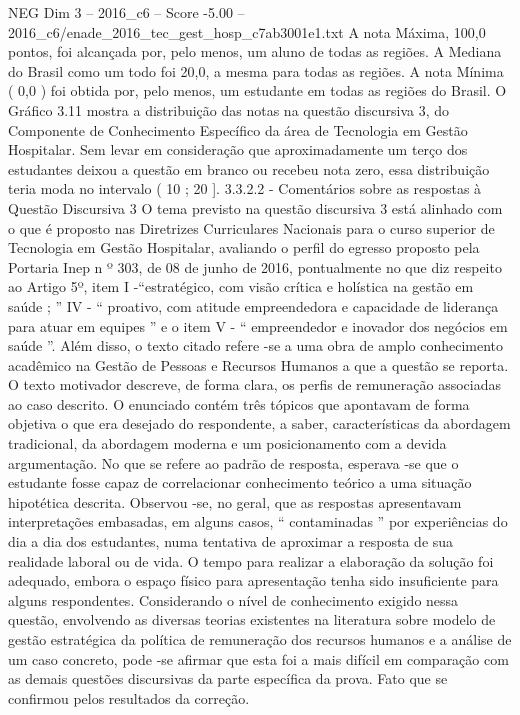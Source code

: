 \begin{textsample}{NEG Dim 3 – 2016\_c6 – Score -5.00 – 2016\_c6/enade\_2016\_tec\_gest\_hosp\_c7ab3001e1.txt}
A nota Máxima, 100,0 pontos, foi alcançada por, pelo menos, um aluno de todas as regiões.
A Mediana do Brasil como um todo foi 20,0, a mesma para todas as regiões.
A nota Mínima ( 0,0 ) foi obtida por, pelo menos, um estudante em todas as regiões do Brasil.
O Gráfico 3.11 mostra a distribuição das notas na questão discursiva 3, do Componente de Conhecimento Específico da área de Tecnologia em Gestão Hospitalar.
Sem levar em consideração que aproximadamente um terço dos estudantes deixou a questão em branco ou recebeu nota zero, essa distribuição teria moda no intervalo ( 10 ; 20 ]. 3.3.2.2 - Comentários sobre as respostas à Questão Discursiva 3 O tema previsto na questão discursiva 3 está alinhado com o que é proposto nas Diretrizes Curriculares Nacionais para o curso superior de Tecnologia em Gestão Hospitalar, avaliando o perfil do egresso proposto pela Portaria Inep n º 303, de 08 de junho de 2016, pontualmente no que diz respeito ao Artigo 5º, item I -“estratégico, com visão crítica e holística na gestão em saúde ; ” IV - “ proativo, com atitude empreendedora e capacidade de liderança para atuar em equipes ” e o item V - “ empreendedor e inovador dos negócios em saúde ”.
Além disso, o texto citado refere -se a uma obra de amplo conhecimento acadêmico na Gestão de Pessoas e Recursos Humanos a que a questão se reporta.
O texto motivador descreve, de forma clara, os perfis de remuneração associadas ao caso descrito.
O enunciado contém três tópicos que apontavam de forma objetiva o que era desejado do respondente, a saber, características da abordagem tradicional, da abordagem moderna e um posicionamento com a devida argumentação.
No que se refere ao padrão de resposta, esperava -se que o estudante fosse capaz de correlacionar conhecimento teórico a uma situação hipotética descrita.
Observou -se, no geral, que as respostas apresentavam interpretações embasadas, em alguns casos, “ contaminadas ” por experiências do dia a dia dos estudantes, numa tentativa de aproximar a resposta de sua realidade laboral ou de vida.
O tempo para realizar a elaboração da solução foi adequado, embora o espaço físico para apresentação tenha sido insuficiente para alguns respondentes.
Considerando o nível de conhecimento exigido nessa questão, envolvendo as diversas teorias existentes na literatura sobre modelo de gestão estratégica da política de remuneração dos recursos humanos e a análise de um caso concreto, pode -se afirmar que esta foi a mais difícil em comparação com as demais questões discursivas da parte específica da prova.
Fato que se confirmou pelos resultados da correção.

\end{textsample}
